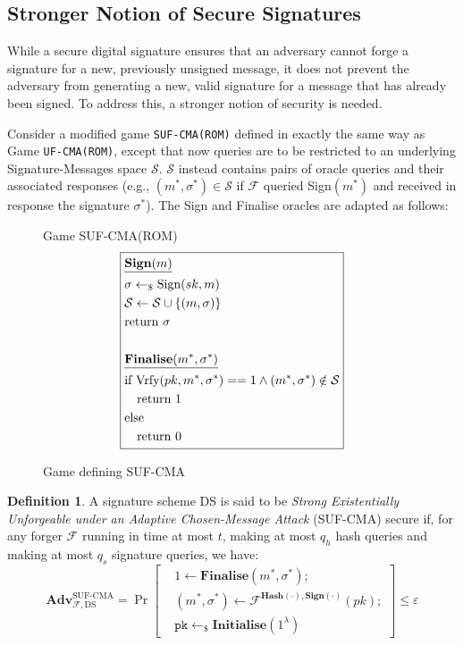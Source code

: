 \documentclass[]{final_report}
\theoremstyle{definition}
\newtheorem{definition}{Definition}[chapter]
\begin{document}
\subsection{Stronger Notion of Secure Signatures}
While a secure digital signature ensures that an adversary cannot forge a signature for a new, previously unsigned message, it does not prevent the adversary from generating a new, valid signature for a message that has already been signed. To address this, a stronger notion of security is needed.

Consider a modified game \texttt{SUF-CMA(ROM)} defined in exactly the same way as Game \texttt{UF-CMA(ROM)}, except that  now queries are to be restricted to an underlying Signature-Messages space $\mathcal{S}$. $\mathcal{S}$ instead contains pairs of oracle queries and their associated responses (e.g., $(m^*, \sigma^*) \in \mathcal{S}$ if  $\mathcal{F}$ queried Sign$(m^*)$ and received in response the signature $\sigma^*$). The Sign and Finalise oracles are adapted as follows:
\begin{figure}[H]
\centering
\hfill Game SUF-CMA(ROM)\hfill\phantom{} 
\[
\boxed{
\begin{aligned}
&\underline{\textbf{\text{Sign}}(m)} \\
&\sigma \leftarrow_{\$} \text{Sign}(sk, m) \\
&\mathcal{S} \leftarrow \mathcal{S} \cup\{(m, \sigma)\} \\
&\text{return } \sigma \\
\\
&\underline{\textbf{\text{Finalise}}(m^*, \sigma^*)} \\
&\text{if Vrfy}(pk, m^*, \sigma^*) == 1 \land (m^*, \sigma^*) \notin \mathcal{S} \\
&\quad \text{return } 1 \\
&\text{else} \\
&\quad \text{return } 0
\end{aligned}
}
\]
\caption{Game defining SUF-CMA}
\label{fig:crypto_game}
\end{figure} 
\begin{definition}
A signature scheme DS is said to be \emph{Strong Existentially Unforgeable under an Adaptive Chosen-Message Attack} (SUF-CMA) secure if, for any forger \(\mathcal{F}\) running in time at most \(t\), making at most \(q_h\) hash queries and making at most \(q_s\) signature queries, we have:
\[
\textbf{Adv}_{\mathcal{F},\text{DS}}^{\text{SUF-CMA}} = \Pr \left[ \begin{aligned} &1 \leftarrow \textbf{Finalise}(m^*, \sigma^*); \\ &(m^*, \sigma^*) \leftarrow \mathcal{F}^{\textbf{Hash}(\cdot),\textbf{Sign}(\cdot)}(pk); \\ &\texttt{pk} \leftarrow_{\$} \textbf{Initialise}(1^{\lambda}) \end{aligned} \right] \leq \varepsilon
\]
\end{definition}
\end{document}
